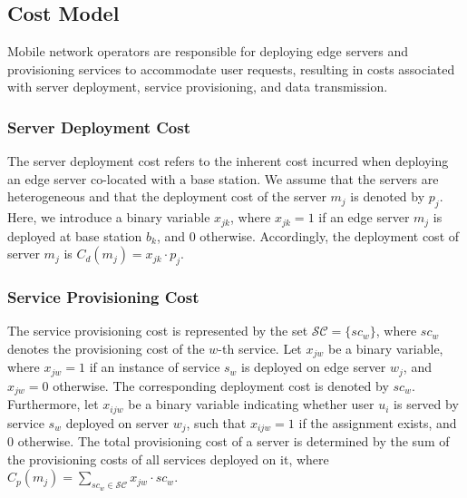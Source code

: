 \documentclass[10pt, conference, letterpaper]{IEEEtran}
\begin{document}
\subsection{Cost Model}
Mobile network operators are responsible for deploying edge servers and provisioning services to accommodate user requests, resulting in costs associated with server deployment, service provisioning, and data transmission. 
\subsubsection{Server Deployment Cost} 
The server deployment cost refers to the inherent cost incurred when deploying an edge server co-located with a base station. We assume that the servers are heterogeneous and that the deployment cost of the server $m_j$ is denoted by $p_j$. Here, we introduce a binary variable $x_{jk}$, where $x_{jk} = 1$ if an edge server $m_j$ is deployed at base station $b_k$, and $0$ otherwise. Accordingly, the deployment cost of server $m_j$ is $C_{d}(m_j)=x_{jk}\cdot p_j$. 

\subsubsection{Service Provisioning Cost} 
The service provisioning cost is represented by the set $\mathcal{SC} = \{sc_{w}\}$, where $sc_{w}$ denotes the provisioning cost of the $w$-th service. Let $x_{jw}$ be a binary variable, where $x_{jw} = 1$ if an instance of service $s_{w}$ is deployed on edge server $w_{j}$, and $x_{jw} = 0$ otherwise. The corresponding deployment cost is denoted by $sc_w$. Furthermore, let $x_{ijw}$ be a binary variable indicating whether user $u_i$ is served by service $s_w$ deployed on server $w_j$, such that $x_{ijw} = 1$ if the assignment exists, and $0$ otherwise. The total provisioning cost of a server is determined by the sum of the provisioning costs of all services deployed on it, where $C_{p}(m_j) = \sum_{sc_w \in \mathcal{SC}} x_{jw} \cdot sc_w$. %
\end{document}
